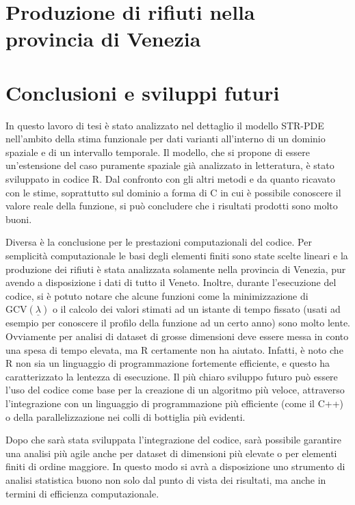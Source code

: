 \documentclass[a4paper,11pt,twoside,openright]{book}							%
\begin{document}
\chapter{Produzione di rifiuti nella provincia di Venezia}
\label{cap:rifiuti}



\chapter{Conclusioni e sviluppi futuri}
\label{cap:conclusione}

In questo lavoro di tesi è stato analizzato nel dettaglio il modello STR-PDE nell'ambito della stima funzionale per dati varianti all'interno di un dominio spaziale e di un intervallo temporale. Il modello, che si propone di essere un'estensione del caso puramente spaziale già analizzato in letteratura, è stato sviluppato in codice R. Dal confronto con gli altri metodi e da quanto ricavato con le stime, soprattutto sul dominio a forma di C in cui è possibile conoscere il valore reale della funzione, si può concludere che i risultati prodotti sono molto buoni.

Diversa è la conclusione per le prestazioni computazionali del codice. Per semplicità computazionale le basi degli elementi finiti sono state scelte lineari e la produzione dei rifiuti è stata analizzata solamente nella provincia di Venezia, pur avendo a disposizione i dati di tutto il Veneto. Inoltre, durante l'esecuzione del codice, si è potuto notare che alcune funzioni come la minimizzazione di $\mathrm{GCV}(\underline \lambda)$ o il calcolo dei valori stimati ad un istante di tempo fissato (usati ad esempio per conoscere il profilo della funzione ad un certo anno) sono molto lente. Ovviamente per analisi di dataset di grosse dimensioni deve essere messa in conto una spesa di tempo elevata, ma R certamente non ha aiutato. Infatti, è noto che R non sia un linguaggio di programmazione fortemente efficiente, e questo ha caratterizzato la lentezza di esecuzione. Il più chiaro sviluppo futuro può essere l'uso del codice come base per la creazione di un algoritmo più veloce, attraverso l'integrazione con un linguaggio di programmazione più efficiente (come il C++) o della parallelizzazione nei colli di bottiglia più evidenti.

Dopo che sarà stata sviluppata l'integrazione del codice, sarà possibile garantire una analisi più agile anche per dataset di dimensioni più elevate o per elementi finiti di ordine maggiore. In questo modo si avrà a disposizione uno strumento di analisi statistica buono non solo dal punto di vista dei risultati, ma anche in termini di efficienza computazionale.
\end{document}

